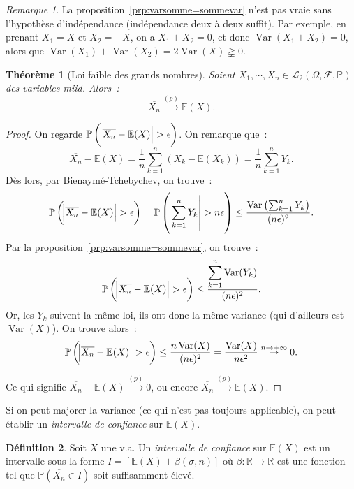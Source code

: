 \documentclass{article}
\newcommand{\E}{\mathbb E}
\renewcommand{\P}{\mathbb P}
\newcommand{\R}{\mathbb R}
\newcommand{\espproba}[3]{\left(#1, #2, #3\right)}  %
\newcommand{\Ofp}{\espproba \Omega{\mathcal F}\P}  %
\newcommand{\Ld}{\mathcal L_2\Ofp}  %
\newcommand{\Ces}{\overline}  %
\newcommand{\convp}{\stackrel {(p)}\to}  %
\DeclareMathOperator{\Var}{Var}
\newtheorem{thm}{Théorème}[section]
\theoremstyle{definition}
\newtheorem{déf}[thm]{Définition}
\theoremstyle{remark}
\newtheorem*{rmq}{Remarque}
\begin{document}
		\begin{rmq} La proposition~\ref{prp:varsomme=sommevar} n'est pas vraie sans l'hypothèse d'indépendance (indépendance deux à deux suffit). Par exemple,
		en prenant $X_1 = X$ et $X_2 = -X$, on a $X_1+X_2 = 0$, et donc $\Var(X_1+X_2) = 0$, alors que $\Var(X_1) + \Var(X_2) = 2\Var(X) \gneqq 0$. \end{rmq}

		\begin{thm}[Loi faible des grands nombres] Soient $X_1, \dotsb, X_n \in \Ld$ des variables miid. Alors~:
		\[\Ces {X_n} \convp \E(X).\]
		\end{thm}

		\begin{proof} On regarde $\P\left(\abs {\Ces {X_n} - \E(X)} > \epsilon\right)$. On remarque que~:
		\[\Ces {X_n} - \E(X) = \frac 1n\sum_{k=1}^n(X_k - \E(X_k)) = \frac 1n\sum_{k=1}^nY_k.\]
		Dès lors, par Bienaymé-Tchebychev, on trouve~:
		\[\P\left(\abs {\Ces {X_n} - \E(X)} > \epsilon\right) = \P\left(\abs {\sum_{k=1}^nY_k} > n\epsilon\right) \leq \frac {\Var\left(\sum_{k=1}^nY_k\right)}{(n\epsilon)^2}.\]
		Par la proposition~\ref{prp:varsomme=sommevar}, on trouve~:
		\[\P\left(\abs {\Ces {X_n} - \E(X)} > \epsilon\right) \leq \frac {\displaystyle \sum_{k=1}^n\Var(Y_k)}{(n\epsilon)^2}.\]
		Or, les $Y_k$ suivent la même loi, ils ont donc la même variance (qui d'ailleurs est $\Var(X)$). On trouve alors~:
		\[\P\left(\abs {\Ces {X_n} - \E(X)} > \epsilon\right) \leq \frac {n\Var(X)}{(n\epsilon)^2} = \frac {\Var(X)}{n\epsilon^2} \stackrel {n \to +\infty}\to 0.\]

		Ce qui signifie $\Ces {X_n} - \E(X) \convp 0$, ou encore $\Ces {X_n} \convp \E(X)$.
		\end{proof}

		Si on peut majorer la variance (ce qui n'est pas toujours applicable), on peut établir un \emph{intervalle de confiance} sur $\E(X)$.

		\begin{déf} Soit $X$ une v.a. Un \emph{intervalle de confiance} sur $\E(X)$ est un intervalle sous la forme $I = [\E(X) \pm \beta(\sigma, n)]$ où
		$\beta : \R \to \R$ est une fonction tel que $\P(\Ces {X_n} \in I)$ soit suffisamment élevé. \end{déf}
\end{document}
